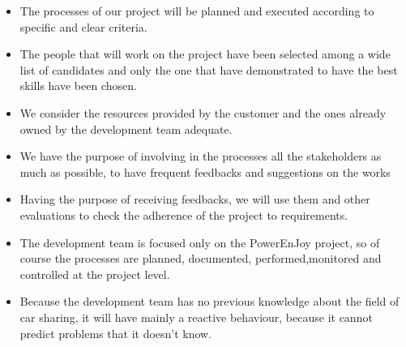 \begin{itemize}
\item The processes of our project will be planned and executed according to specific and clear criteria. 
\item The people that will work on the project have been selected among a wide list of candidates and only the one that have demonstrated to have the best skills have been chosen.
\item We consider the resources provided by the customer and the ones already owned by the development team adequate.
\item We have the purpose of involving in the processes all the stakeholders as much as possible, to have frequent feedbacks and suggestions on the works
\item Having the purpose of receiving feedbacks, we will use them and other evaluations to check the adherence of the project to requirements.
\item The development team is focused only on the PowerEnJoy project, so of course the processes are planned, documented, performed,monitored and controlled at the project level.
\item Because the development team has no previous knowledge about the field of car sharing, it will have mainly a reactive behaviour, because it cannot predict problems that it doesn't know.  
\end{itemize}  